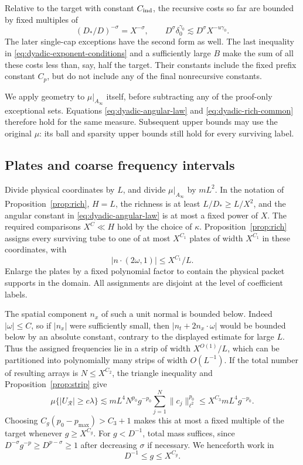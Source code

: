 Relative to the target with constant $C_{\rm ind}$, the recursive costs
so far are bounded by fixed multiples of
\begin{equation}\label{eq:dyadic-contraction}
 (D_*/D)^{-\sigma}=X^{-\sigma},\qquad
 D^\sigma\delta_0^{\gamma_0}
 \lesssim D^\sigma X^{-u\gamma_0}.
\end{equation}
The later single-cap exceptions have the second form as well.  The last
inequality in \eqref{eq:dyadic-exponent-conditions} and a sufficiently
large $B$ make the sum of all these costs less than, say, half the
target.  Their constants include the fixed prefix constant $C_p$, but
do not include any of the final nonrecursive constants.

We apply geometry to $\mu|_{A_\infty}$ itself, before subtracting any of
the proof-only exceptional sets.  Equations
\eqref{eq:dyadic-angular-law} and \eqref{eq:dyadic-rich-common}
therefore hold for the same measure.  Subsequent upper bounds may use
the original $\mu$: its ball and sparsity upper bounds still hold for
every surviving label.

\subsection{Plates and coarse frequency intervals}

Divide physical coordinates by $L$, and divide $\mu|_{A_\infty}$ by
$mL^2$.  In the notation of Proposition~\ref{prop:rich}, $H=L$,
the richness is at least $L/D_*\geq L/X^2$, and the angular constant
in \eqref{eq:dyadic-angular-law} is at most a fixed power of $X$.
The required comparisons $X^C\ll H$ hold by the choice of $\kappa$.
Proposition~\ref{prop:rich} assigns every surviving tube to one of at
most $X^{C_1}$ plates of width $X^{C_1}$ in these coordinates, with
\[
 |n\cdot(2\omega,1)|\leq X^{C_1}/L.
\]
Enlarge the plates by a fixed polynomial factor to contain the physical
packet supports in the domain.  All assignments are disjoint at the
level of coefficient labels.

The spatial component $n_x$ of such a unit normal is bounded below.
Indeed $|\omega|\leq C$, so if $|n_x|$ were sufficiently small, then
$|n_t+2n_x\cdot\omega|$ would be bounded below by an absolute constant,
contrary to the displayed estimate for large $L$.  Thus the assigned
frequencies lie in a strip of width $X^{O(1)}/L$, which can be partitioned
into polynomially many strips of width $O(L^{-1})$.  If the total number
of resulting arrays is $N\leq X^{C_2}$, the triangle inequality and
Proposition~\ref{prop:strip} give
\begin{equation}\label{eq:dyadic-large-level}
 \mu\{|U_{\mathcal R}|\geq c\lambda\}
 \lesssim mL^4N^{p_0}g^{-p_0}
       \sum_{j=1}^N\|c_j\|_{\ell^2}^{p_0}
 \leq X^{C_3}mL^4g^{-p_0}.
\end{equation}
Choosing $C_g(p_0-p_{\max})>C_3+1$ makes this at most a fixed multiple
of the target whenever $g\geq X^{C_g}$.  For $g<D^{-1}$, total mass
suffices, since $D^{-\sigma}g^{-p}\geq D^{p-\sigma}\geq1$ after
decreasing $\sigma$ if necessary.  We henceforth work in
\begin{equation}\label{eq:dyadic-middle-levels}
 D^{-1}\leq g\leq X^{C_g}.
\end{equation}

